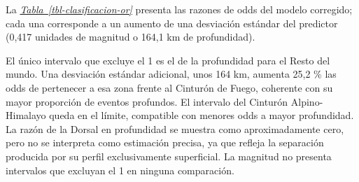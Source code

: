 \documentclass[
  spanish,
  letterpaper,
  DIV=11,
  numbers=noendperiod]{scrartcl}
\newcommand{\asesoriaStyledRef}[1]{%
  {\hypersetup{linkcolor=asesoriaLinkColor,urlcolor=asesoriaLinkColor,citecolor=asesoriaLinkColor}\textcolor{asesoriaLinkColor}{\emph{#1}}}%
}
\newcommand{\asesoriaTableLink}[1]{\hyperref[#1]{Tabla~\ref*{#1}}}
\newcommand{\asesoriaTableRef}[1]{\asesoriaStyledRef{\asesoriaTableLink{#1}}}
\begin{document}
\newsavebox{\tblClasificacionORBox}
\noindent
\begin{minipage}[t]{\dimexpr\linewidth-\wd\tblClasificacionORBox-1em\relax}
\vspace{0pt}
La \asesoriaTableRef{tbl-clasificacion-or} presenta las razones de odds del modelo corregido; cada una corresponde a un aumento de una desviación estándar del predictor (0,417 unidades de magnitud o 164,1 km de profundidad).
\end{minipage}\hfill
\begin{minipage}[t]{\wd\tblClasificacionORBox}
\vspace{0pt}
\begingroup
\scriptsize
\centering
{}
{}
\label{tbl-clasificacion-or}
\hypertarget{dest-tbl-clasificacion-or}{}
\usebox{\tblClasificacionORBox}
\par\vspace{0.10em}
\endgroup
\end{minipage}
\par\vspace{-0.25em}

El único intervalo que excluye el 1 es el de la profundidad para el
Resto del mundo. Una desviación estándar adicional, unos 164 km, aumenta
25,2 \% las odds de pertenecer a esa zona frente al Cinturón de Fuego,
coherente con su mayor proporción de eventos profundos. El intervalo del
Cinturón Alpino-Himalayo queda en el límite, compatible con menores odds
a mayor profundidad. La razón de la Dorsal en profundidad se muestra
como aproximadamente cero, pero no se interpreta como estimación
precisa, ya que refleja la separación producida por su perfil
exclusivamente superficial. La magnitud no presenta intervalos que
excluyan el 1 en ninguna comparación.
\end{document}
